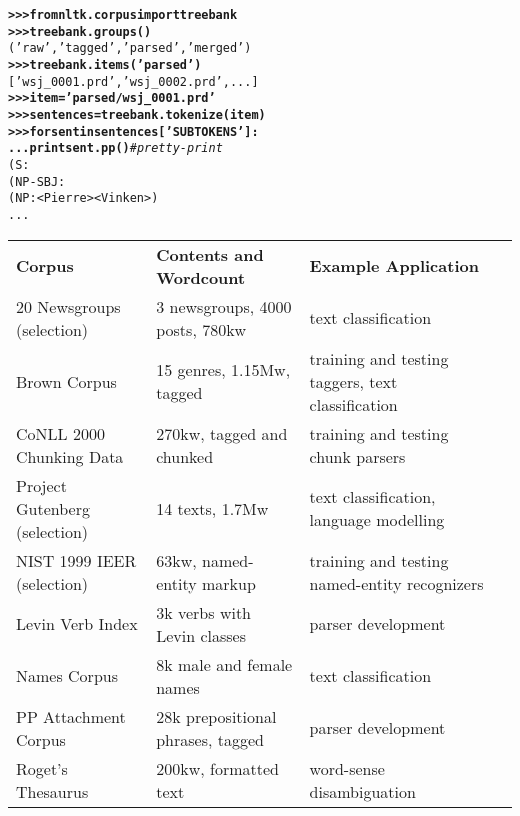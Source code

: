 \documentclass[11pt]{article}
\begin{document}
\begin{alltt}\small
\textbf{>>> from nltk.corpus import treebank}
\textbf{>>> treebank.groups()}
('raw', 'tagged', 'parsed', 'merged')
\textbf{>>> treebank.items('parsed')}
['wsj_0001.prd', 'wsj_0002.prd', ...]
\textbf{>>> item = 'parsed/wsj_0001.prd'}
\textbf{>>> sentences = treebank.tokenize(item)}
\textbf{>>> for sent in sentences['SUBTOKENS']:}
\textbf{...     print sent.pp()} \emph{# pretty-print}
(S:
  (NP-SBJ:
    (NP: <Pierre> <Vinken>)
    ...
\end{alltt}
%

\begin{table*}
\small\noindent
\begin{boxedminipage}{\linewidth}
\begin{tabular}{llll}
\textbf{Corpus} &
\textbf{Contents and Wordcount} &
\textbf{Example Application} \\

20 Newsgroups (selection) &
3 newsgroups, 4000 posts, 780kw &
text classification \\

Brown Corpus &
15 genres, 1.15Mw, tagged &
training and testing taggers, text classification \\

CoNLL 2000 Chunking Data &
270kw, tagged and chunked &
training and testing chunk parsers \\

Project Gutenberg (selection) &
14 texts, 1.7Mw &
text classification, language modelling \\

NIST 1999 IEER (selection) &
63kw, named-entity markup &
training and testing named-entity recognizers \\

Levin Verb Index &
3k verbs with Levin classes &
parser development \\

Names Corpus &
8k male and female names &
text classification \\

PP Attachment Corpus &
28k prepositional phrases, tagged &
parser development \\

Roget's Thesaurus &
200kw, formatted text &
word-sense disambiguation \\


\end{tabular}
\end{boxedminipage}
\end{table*}
\end{document}
